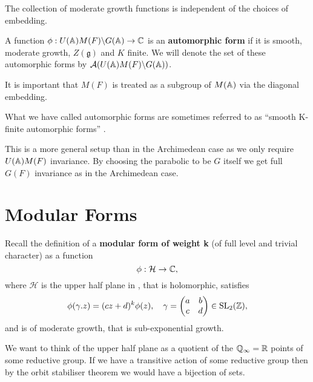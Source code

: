     \begin{remark}
        The collection of moderate growth functions is independent of the choices of embedding. 
    \end{remark}

\begin{definition}
    A function \(\phi: U(\A)M(F)\backslash G(\A) \to \C\) is an \textbf{automorphic form} if it is smooth, moderate growth, \(Z(\mathfrak{g})\) and \(K\) finite. We will denote the set of these automorphic forms by \(\mathcal{A}(U(\A)M(F)\backslash G(\A))\).
\end{definition}

\begin{remark}
    It is important that \(M(F)\) is treated as a subgroup of \(M(\A)\) via the diagonal embedding.
\end{remark}
\begin{remark}
	What we have called automorphic forms are sometimes referred to as ``smooth K-finite automorphic forms'' \cite[2.2]{cogdellLecturesLfunctionsConverse}.
\end{remark}
\begin{remark}
	This is a more general setup than in the Archimedean case as we only require \(U(\A)M(F)\) invariance. By choosing the parabolic to be \(G\) itself we get full \(G(F)\) invariance as in the Archimedean case. 
\end{remark}
	
    

\section{Modular Forms} \label{sec:modular-forms}

	Recall the definition of a \textbf{modular form of weight k} (of full level and trivial character) \cite[1.1.2]{diamondFirstCourseModular2005} as a function
		\[\phi: \mathcal{H} \to \C,\]
		where \(\mathcal{H}\) is the upper half plane in \C, that is holomorphic, satisfies 
		\[\phi(\gamma.z) = (cz+d)^k\phi(z), \quad \gamma = \begin{pmatrix}
			a &b \\
			c &d
		\end{pmatrix}\in \SL_2(\Z),\]
		and is of moderate growth, that is sub-exponential growth.

	We want to think of the upper half plane as a quotient of the \(\Q_\infty = \R\) points of some reductive group. If we have a transitive action of some reductive group then by the orbit stabiliser theorem we would have a bijection of sets.

